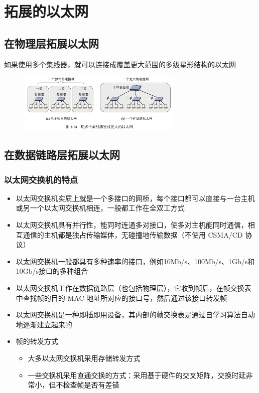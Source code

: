 \documentclass[cs4size,a4paper,10pt]{ctexart}
\begin{document}
	\section{拓展的以太网}

	\subsection{在物理层拓展以太网}

	如果使用多个集线器，就可以连接成覆盖更大范围的多级星形结构的以太网

	\begin{figure}[H]
		\centering
		\includegraphics[width=0.7\textwidth]{img/3.24}
	\end{figure}

	\subsection{在数据链路层拓展以太网}
	
	\subsubsection{以太网交换机的特点}

	\begin{itemize}
		\item 以太网交换机实质上就是一个多接口的网桥，每个接口都可以直接与一台主机或另一个以太网交换机相连，一般都工作在全双工方式
		\item 以太网交换机具有并行性，能同时连通多对接口，使多对主机能同时通信，相互通信的主机都是独占传输媒体，无碰撞地传输数据（不使用 CSMA/CD 协议）
		\item 以太网交换机一般都具有多种速率的接口，例如10Mb/s、100Mb/s、1Gb/s和10Gb/s接口的多种组合
		\item 以太网交换机工作在数据链路层（也包括物理层），它收到帧后，在帧交换表中查找帧的目的 MAC 地址所对应的接口号，然后通过该接口转发帧
		\item 以太网交换机是一种即插即用设备，其内部的帧交换表是通过自学习算法自动地逐渐建立起来的
		\item 帧的转发方式
		\begin{itemize}
			\item 大多以太网交换机采用存储转发方式
			\item 一些交换机采用直通交换的方式：采用基于硬件的交叉矩阵，交换时延非常小，但不检查帧是否有差错
		\end{itemize}
	\end{itemize}
\end{document}
